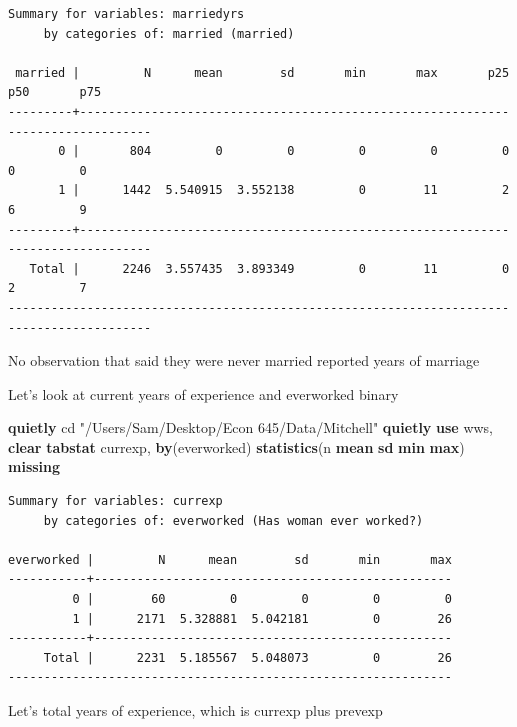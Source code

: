\documentclass[
]{book}
\newenvironment{Shaded}{\begin{snugshade}}{\end{snugshade}}
\newcommand{\FunctionTok}[1]{\textcolor[rgb]{0.13,0.29,0.53}{\textbf{#1}}}
\newcommand{\KeywordTok}[1]{\textcolor[rgb]{0.13,0.29,0.53}{\textbf{#1}}}
\newcommand{\NormalTok}[1]{#1}
\newcommand{\StringTok}[1]{\textcolor[rgb]{0.31,0.60,0.02}{#1}}
\begin{document}
\begin{verbatim}
Summary for variables: marriedyrs
     by categories of: married (married)

 married |         N      mean        sd       min       max       p25       p50       p75
---------+--------------------------------------------------------------------------------
       0 |       804         0         0         0         0         0         0         0
       1 |      1442  5.540915  3.552138         0        11         2         6         9
---------+--------------------------------------------------------------------------------
   Total |      2246  3.557435  3.893349         0        11         0         2         7
------------------------------------------------------------------------------------------
\end{verbatim}

No observation that said they were never married reported years of marriage

Let's look at current years of experience and everworked binary

\begin{Shaded}
\begin{Highlighting}[]
\KeywordTok{quietly}\NormalTok{ cd }\StringTok{"/Users/Sam/Desktop/Econ 645/Data/Mitchell"}
\KeywordTok{quietly} \KeywordTok{use}\NormalTok{ wws, }\KeywordTok{clear}
\KeywordTok{tabstat}\NormalTok{ currexp, }\KeywordTok{by}\NormalTok{(everworked) }\KeywordTok{statistics}\NormalTok{(n }\KeywordTok{mean} \FunctionTok{sd} \FunctionTok{min} \FunctionTok{max}\NormalTok{) }\FunctionTok{missing}
\end{Highlighting}
\end{Shaded}

\begin{verbatim}
Summary for variables: currexp
     by categories of: everworked (Has woman ever worked?)

everworked |         N      mean        sd       min       max
-----------+--------------------------------------------------
         0 |        60         0         0         0         0
         1 |      2171  5.328881  5.042181         0        26
-----------+--------------------------------------------------
     Total |      2231  5.185567  5.048073         0        26
--------------------------------------------------------------
\end{verbatim}

Let's total years of experience, which is currexp plus prevexp
\end{document}
